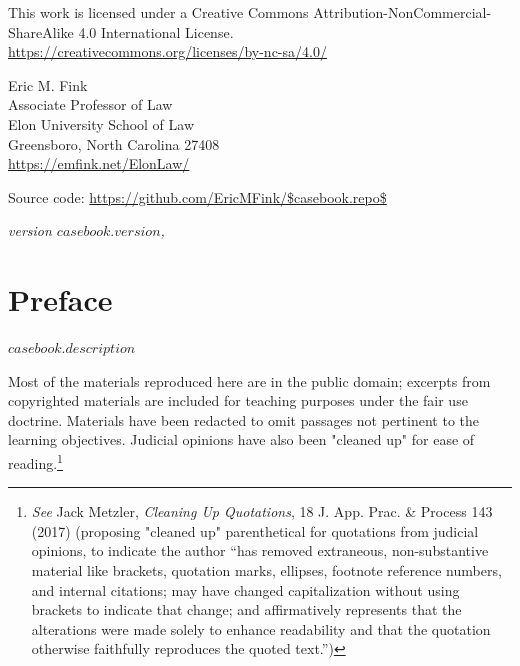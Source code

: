 \begin{small}
\raggedright{This work is licensed under a Creative Commons Attribution-NonCommercial-ShareAlike 4.0 International License.} \\
\url{https://creativecommons.org/licenses/by-nc-sa/4.0/}

\vspace{1em}

Eric M. Fink\\
Associate Professor of Law \\
Elon University School of Law \\
Greensboro, North Carolina 27408 \\
\url{https://emfink.net/ElonLaw/}

\vspace{1em}

Source code: \url{https://github.com/EricMFink/$casebook.repo$}

\itshape{version $casebook.version$, \monthyear}

\end{small}
\endgroup

\clearpage


\thispagestyle{empty}

\vspace*{\fill}
\vspace*{\fill}

\chapter*{Preface}

{$casebook.description$}

Most of the materials reproduced here are in the public domain; excerpts from copyrighted materials are included for teaching purposes under the fair use doctrine. Materials have been redacted to omit passages not pertinent to the learning objectives. Judicial opinions have also been "cleaned up" for ease of reading.\footnote{\textit{See} Jack Metzler, {\textit{Cleaning Up Quotations}}, 18 J. App. Prac. \& Process 143 (2017) (proposing "cleaned up" parenthetical for quotations from judicial opinions, to indicate the author “has removed extraneous, non-substantive material like brackets, quotation marks, ellipses, footnote reference numbers, and internal citations; may have changed capitalization without using brackets to indicate that change; and affirmatively represents that the alterations were made solely to enhance readability and that the quotation otherwise faithfully reproduces the quoted text.”)} 